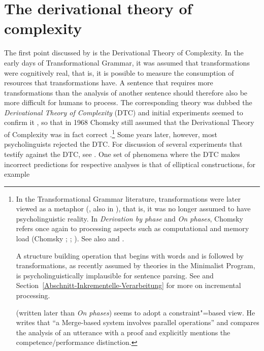 \section{The derivational theory of complexity}
\label{sec-dtc}

The first point discussed by \citet{SW2011a} is the Derivational Theory of Complexity.
In  the early days of Transformational Grammar,
it was assumed that transformations were cognitively real, that is, it is possible to measure the consumption of resources
that transformations have.
A sentence that requires more transformations than the analysis of another sentence should therefore also be more difficult for humans
to process. The corresponding theory was dubbed the \emph{Derivational Theory of Complexity} (DTC) and initial experiments
seemed to confirm it \citep{MMK64a,SP65a,CO66a}, so that in 1968 Chomsky still assumed that the
Derivational Theory of Complexity was in fact correct
\citep[--250]{Chomsky76b-u}.\footnote{%
In the Transformational Grammar literature, transformations were later viewed as a metaphor
(\citealp[]{Lohnstein2014a}, also in \citealp[Footnote~4]{Chomsky2001a-u}), that is,
it was no longer assumed to have psycholinguistic reality. In \emph{Derivation by phase} and
\emph{On phases}, Chomsky refers once again to processing aspects such as computational and memory load (Chomsky \citeyear[, 12,
   15]{Chomsky2001a-u}; \citeyear[, 12]{Chomsky2007a}; \citeyear[, 145, 146,
   155]{Chomsky2008a}). See also  and .

  A structure building operation that begins with words and is followed by transformations, as recently assumed by theories in the Minimalist Program,
  is psycholinguistically implausible for sentence parsing. See  and Section~\ref{Abschnitt-Inkrementelle-Verarbeitung} for
  more on incremental processing.

  \citet[]{Chomsky2007a} (written later than \emph{On phases}) seems to adopt a constraint"=based view. He writes that ``a Merge-based system involves parallel operations''
  and compares the analysis of an utterance with a proof and explicitly mentions the competence/performance distinction.
} 
Some years later, however, most psycholinguists rejected the DTC. For discussion of several experiments that testify against
the DTC, see . One set of phenomena where the DTC makes incorrect predictions for respective analyses is that of elliptical constructions, for example
